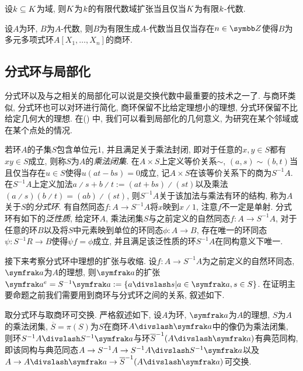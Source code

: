 \begin{proposition}
    设$k\subseteq K$为域, 则$K$为$k$的有限代数域扩张当且仅当$K$为有限$k$-代数.
\end{proposition}

\begin{proposition}\label{prop:fgalgebra}
    设$A$为环, $B$为$A$-代数, 则$B$为有限生成$A$-代数当且仅当存在$n\in \ZZ$使得$B$为多元多项式环$A[X_1, \dotsc, X_n]$的商环.
\end{proposition}

\subsection{分式环与局部化}

分式环以及与之相关的局部化可以说是交换代数中最重要的技术之一了. 与商环类似, 分式环也可以对环进行简化, 商环保留不比给定理想小的理想, 分式环保留不比给定几何大的理想. 在()%
中, 我们可以看到局部化的几何意义, 为研究在某个邻域或在某个点处的情况.

若环$A$的子集$S$包含单位元1, 并且满足关于乘法封闭, 即对于任意的$x, y\in S$都有$xy\in S$成立, 则称$S$为$A$的\emph{乘法闭集}. 在$A\times S$上定义等价关系$\sim$, $(a, s)\sim (b, t)$当且仅当存在$u\in S$使得$u(at-bs)=0$成立, 记$A\times S$在该等价关系下的商为$S^{-1}A$. 在$S^{-1}A$上定义加法$a{\divslash} s+b{\divslash}t := (at+bs){\divslash}(st)$以及乘法$(a{\divslash}s)(b{\divslash}t)=(ab){\divslash}(st)$, 则$S^{-1}A$关于该加法与乘法有环的结构, 称为$A$关于$S$的\emph{分式环}. 有自然同态$f\colon A\to S^{-1}A$将$x$映到$x{\divslash}1$, 注意$f$不一定是单射. 分式环有如下的\emph{泛性质}\parencites[81, Theorem 11.3]{altman_term_2017}[37, Proposition 3.1]{atiyah_introduction_1969}, 给定环$A$, 乘法闭集$S$与之前定义的自然同态$f\colon A\to S^{-1}A$, 对于任意的环$B$以及将$S$中元素映到单位的环同态$\phi\colon A\to B$, 存在唯一的环同态$\psi\colon S^{-1}R\to B$使得$\psi f=\phi$成立, 并且满足该泛性质的环$S^{-1}A$在同构意义下唯一.

接下来考察分式环中理想的扩张与收缩. 设$f\colon A\to S^{-1}A$为之前定义的自然环同态, $\ideal{a}$为$A$的理想, 则$\ideal{a}$的扩张$\ideal{a}^e=S^{-1}\ideal{a}:=\{a{\divslash}s\vert a\in\ideal{a}, s\in S\}$. 在证明主要命题之前我们需要用到商环与分式环之间的关系, 叙述如下.

\begin{proposition}
    取分式环与取商环可交换. 严格叙述如下, 设$A$为环, $\ideal{a}$为$A$的理想, $S$为$A$的乘法闭集, $\overline{S}=\pi(S)$为$S$在商环$A{\divslash}\ideal{a}$中的像仍为乘法闭集, 则环$\SASa$与环$\SAa$有典范同构, 即该同构与典范同态$A\to S^{-1}A\to \SASa$以及$A\to A{\divslash}\ideal{a}\to \SAa$可交换.
\end{proposition}

